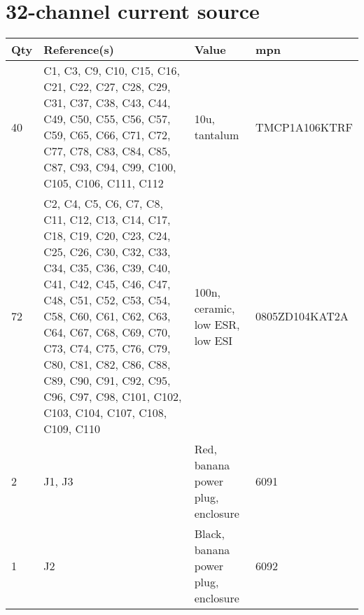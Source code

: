 \section{32-channel current source}
\begin{longtable}[c]{@{} lp{5cm}p{5cm}l @{}}
    \toprule
    Qty & Reference(s)                                                                                                                                                                                                                                                                                                                                                             & Value                                               & \acrshort{mpn}  \\
    \midrule
    40  & C1, C3, C9, C10, C15, C16, C21, C22, C27, C28, C29, C31, C37, C38, C43, C44, C49, C50, C55, C56, C57, C59, C65, C66, C71, C72, C77, C78, C83, C84, C85, C87, C93, C94, C99, C100, C105, C106, C111, C112                                                                                                                                                                 & 10u, tantalum                                       & TMCP1A106KTRF   \\
    72  & C2, C4, C5, C6, C7, C8, C11, C12, C13, C14, C17, C18, C19, C20, C23, C24, C25, C26, C30, C32, C33, C34, C35, C36, C39, C40, C41, C42, C45, C46, C47, C48, C51, C52, C53, C54, C58, C60, C61, C62, C63, C64, C67, C68, C69, C70, C73, C74, C75, C76, C79, C80, C81, C82, C86, C88, C89, C90, C91, C92, C95, C96, C97, C98, C101, C102, C103, C104, C107, C108, C109, C110 & 100n, ceramic, low ESR, low ESI                     & 0805ZD104KAT2A  \\
    2   & J1, J3                                                                                                                                                                                                                                                                                                                                                                   & Red, banana power plug, enclosure                   & 6091            \\
    1   & J2                                                                                                                                                                                                                                                                                                                                                                       & Black, banana power plug, enclosure                 & 6092            \\

\end{longtable}
